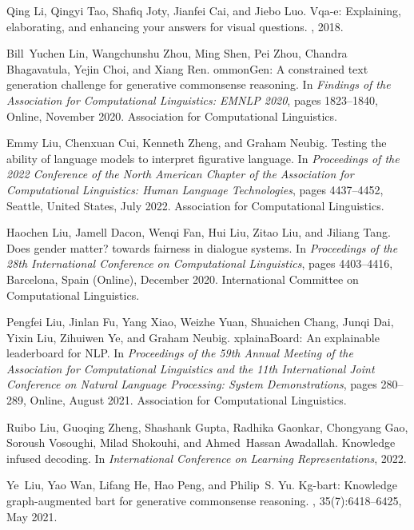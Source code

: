 \documentclass[11pt]{article}
\begin{document}
\begin{thebibliography}{100}
Qing Li, Qingyi Tao, Shafiq Joty, Jianfei Cai, and Jiebo Luo.
\newblock Vqa-e: Explaining, elaborating, and enhancing your answers for visual
  questions.
, 2018.

Bill~Yuchen Lin, Wangchunshu Zhou, Ming Shen, Pei Zhou, Chandra Bhagavatula,
  Yejin Choi, and Xiang Ren.
ommon{G}en: A constrained text generation challenge for generative
  commonsense reasoning.
\newblock In {\em Findings of the Association for Computational Linguistics:
  EMNLP 2020}, pages 1823--1840, Online, November 2020. Association for
  Computational Linguistics.

Emmy Liu, Chenxuan Cui, Kenneth Zheng, and Graham Neubig.
\newblock Testing the ability of language models to interpret figurative
  language.
\newblock In {\em Proceedings of the 2022 Conference of the North American
  Chapter of the Association for Computational Linguistics: Human Language
  Technologies}, pages 4437--4452, Seattle, United States, July 2022.
  Association for Computational Linguistics.

Haochen Liu, Jamell Dacon, Wenqi Fan, Hui Liu, Zitao Liu, and Jiliang Tang.
\newblock Does gender matter? towards fairness in dialogue systems.
\newblock In {\em Proceedings of the 28th International Conference on
  Computational Linguistics}, pages 4403--4416, Barcelona, Spain (Online),
  December 2020. International Committee on Computational Linguistics.

Pengfei Liu, Jinlan Fu, Yang Xiao, Weizhe Yuan, Shuaichen Chang, Junqi Dai,
  Yixin Liu, Zihuiwen Ye, and Graham Neubig.
xplaina{B}oard: An explainable leaderboard for {NLP}.
\newblock In {\em Proceedings of the 59th Annual Meeting of the Association for
  Computational Linguistics and the 11th International Joint Conference on
  Natural Language Processing: System Demonstrations}, pages 280--289, Online,
  August 2021. Association for Computational Linguistics.

Ruibo Liu, Guoqing Zheng, Shashank Gupta, Radhika Gaonkar, Chongyang Gao,
  Soroush Vosoughi, Milad Shokouhi, and Ahmed~Hassan Awadallah.
\newblock Knowledge infused decoding.
\newblock In {\em International Conference on Learning Representations}, 2022.

Ye~Liu, Yao Wan, Lifang He, Hao Peng, and Philip~S. Yu.
\newblock Kg-bart: Knowledge graph-augmented bart for generative commonsense
  reasoning.
,
  35(7):6418--6425, May 2021.


\end{thebibliography}
\end{document}
